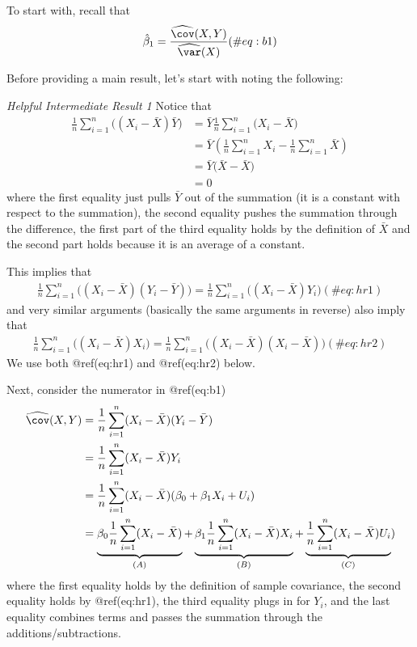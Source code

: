 \documentclass[
  letterpaper,
  DIV=11,
  numbers=noendperiod]{scrreprt}
\begin{document}
To start with, recall that \begin{align}
  \hat{\beta}_1 = \frac{\widehat{\cov}(X,Y)}{\widehat{\var}(X)} (\#eq:b1)
\end{align}

Before providing a main result, let's start with noting the following:

\emph{Helpful Intermediate Result 1} Notice that \begin{align*}
  \frac{1}{n}\sum_{i=1}^n \Big( (X_i - \bar{X})\bar{Y}\Big) &= \bar{Y} \frac{1}{n}\sum_{i=1}^n \Big( X_i-\bar{X} \Big) \\
  &= \bar{Y} \left( \frac{1}{n}\sum_{i=1}^n X_i - \frac{1}{n}\sum_{i=1}^n \bar{X} \right) \\
  &= \bar{Y} \Big(\bar{X} - \bar{X} \Big) \\
  &= 0
\end{align*} where the first equality just pulls \(\bar{Y}\) out of the
summation (it is a constant with respect to the summation), the second
equality pushes the summation through the difference, the first part of
the third equality holds by the definition of \(\bar{X}\) and the second
part holds because it is an average of a constant.

This implies that \begin{align}
  \frac{1}{n}\sum_{i=1}^n \Big( (X_i - \bar{X})(Y_i - \bar{Y})\Big) = \frac{1}{n}\sum_{i=1}^n \Big( (X_i - \bar{X})Y_i\Big) (\#eq:hr1)
\end{align} and very similar arguments (basically the same arguments in
reverse) also imply that \begin{align}
  \frac{1}{n}\sum_{i=1}^n \Big( (X_i - \bar{X})X_i\Big) = \frac{1}{n}\sum_{i=1}^n \Big( (X_i - \bar{X})(X_i - \bar{X})\Big) (\#eq:hr2)
\end{align} We use both @ref(eq:hr1) and @ref(eq:hr2) below.

\vspace{100pt}

Next, consider the numerator in @ref(eq:b1) \begin{align*}
  \widehat{\cov}(X,Y) &= \frac{1}{n} \sum_{i=1}^n (X_i - \bar{X})(Y_i - \bar{Y}) \\
  &= \frac{1}{n} \sum_{i=1}^n (X_i - \bar{X})Y_i \\
  &= \frac{1}{n} \sum_{i=1}^n (X_i - \bar{X})(\beta_0 + \beta_1 X_i + U_i) \\
  &= \underbrace{\beta_0 \frac{1}{n} \sum_{i=1}^n (X_i - \bar{X})}_{(A)} + \underbrace{\beta_1 \frac{1}{n} \sum_{i=1}^n (X_i - \bar{X}) X_i}_{(B)} + \underbrace{\frac{1}{n} \sum_{i=1}^n (X_i - \bar{X}) U_i}_{(C)}) \\
\end{align*} where the first equality holds by the definition of sample
covariance, the second equality holds by @ref(eq:hr1), the third
equality plugs in for \(Y_i\), and the last equality combines terms and
passes the summation through the additions/subtractions.
\end{document}
